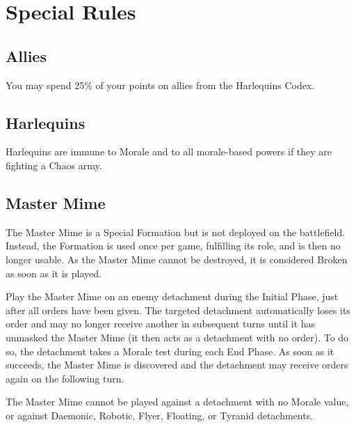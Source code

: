 \section{Special Rules}

\subsection{Allies}

You may spend 25\% of your points on allies from the Harlequins Codex.

\subsection{Harlequins}

Harlequins are immune to Morale and to all morale-based powers if they are fighting a Chaos army.

\subsection{Master Mime}

The Master Mime is a Special Formation but is not deployed on the battlefield. Instead, the Formation is used once per game, fulfilling its role, and is then no longer usable. As the Master Mime cannot be destroyed, it is considered Broken as soon as it is played.

Play the Master Mime on an enemy detachment during the Initial Phase, just after all orders have been given. The targeted detachment automatically loses its order and may no longer receive another in subsequent turns until it has unmasked the Master Mime (it then acts as a detachment with no order). To do so, the detachment takes a Morale test during each End Phase. As soon as it succeeds, the Master Mime is discovered and the detachment may receive orders again on the following turn.

The Master Mime cannot be played against a detachment with no Morale value, or against Daemonic, Robotic, Flyer, Floating, or Tyranid detachments.
